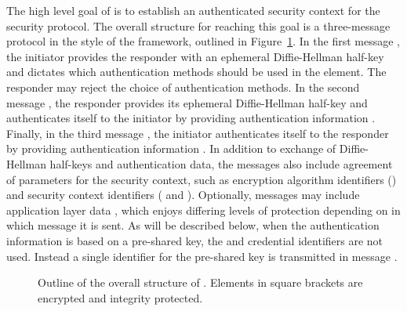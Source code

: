 The high level goal of \mEdhoc{} is to establish an authenticated security
context for the \mOscore{} security protocol.
%
The overall structure for reaching this goal is a three-message protocol in
the style of the \mNoise{} framework, outlined in
Figure~\ref{fig:edhocFramework}.
%
In the first message \mMsgone{}, the initiator provides the responder with an
ephemeral Diffie-Hellman half-key \mGx{} and dictates which authentication
methods should be used in the \mMethod{} element.
%
The responder may reject the choice of authentication methods.
%
In the second message \mMsgtwo{}, the responder provides its ephemeral
Diffie-Hellman half-key \mGy{} and authenticates itself to the initiator by
providing authentication information \mAuthr{}.
%
Finally, in the third message \mMsgthree{}, the initiator authenticates itself
to the responder by providing authentication information \mAuthi{}.
%
In addition to exchange of Diffie-Hellman half-keys and authentication data,
the messages also include agreement of parameters for the \mOscore{} security
context, such as encryption algorithm identifiers (\mSuites{}) and \mOscore{}
security context identifiers (\mCi{} and \mCr{}).
%
Optionally, messages may include application layer data \mAD{}, which enjoys
differing levels of protection depending on in which message it is sent.
%
As will be described below, when the authentication information is based on a
pre-shared key, the \mCredi{} and \mCredr{} credential identifiers are not
used.
%
Instead a single identifier for the pre-shared key is transmitted in message
\mMsgone{}.
%

\begin{figure}[!h]
\centering
{}
\caption{Outline of the overall structure of \mEdhoc{}. Elements in square
brackets are encrypted and integrity protected.}
\label{fig:edhocFramework}
\end{figure}


